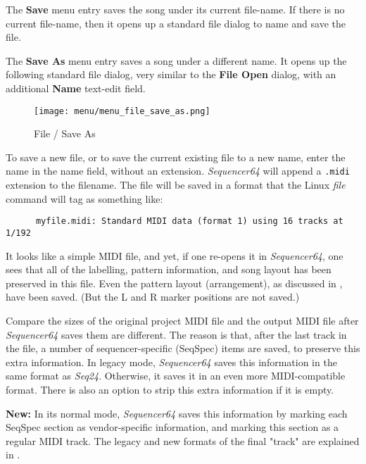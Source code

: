    The \textbf{Save} menu entry saves the song under its current file-name.
   If there is no current file-name, then it opens up a standard file
   dialog to name and save the file.

   The \textbf{Save As} menu entry saves a song under a different name.
   It opens up the following standard file dialog, very similar to the 
   \textbf{File Open} dialog, with an additional \textbf{Name} text-edit field.

\begin{figure}[H]
   \centering 
   \texttt{[image: menu/menu\_file\_save\_as.png]}
   \caption{File / Save As}
   \label{fig:seq64_menu_file_save_as}
\end{figure}

   To save a new file, or to save the current existing file to a new name,
   enter the name in the name field, without an extension.
   \textsl{Sequencer64} will append a \texttt{.midi} extension to the filename.
   The file will be saved in a format that the Linux \textsl{file} command
   will tag as something like:

   \begin{verbatim}
      myfile.midi: Standard MIDI data (format 1) using 16 tracks at 1/192
   \end{verbatim}

   It looks like a simple MIDI file, and yet, if one re-opens it in
   \textsl{Sequencer64}, one sees that all of the labelling, pattern information,
   and song layout has been preserved in this file.
   Even the pattern layout (arrangement), as discussed in
   ,
   have been saved.
   (But the L and R marker positions are not saved.)

   Compare the sizes of the original project MIDI file
   and the output MIDI file after \textsl{Sequencer64} saves them
   are different.
   The reason is that, after the last track in the file, a number of
   sequencer-specific (SeqSpec) items are saved, to preserve this extra
   information.  In legacy mode, \textsl{Sequencer64} saves this information
   in the same format as \textsl{Seq24}. Otherwise, it saves it
   in an even more MIDI-compatible format.  There is also an option to strip
   this extra information if it is empty.

   \textbf{New:}
   In its normal mode, \textsl{Sequencer64} saves this
   information by marking each SeqSpec section
   as vendor-specific information, and marking this section as a regular
   MIDI track.
   The legacy and new formats of the final "track" are explained in
   .

